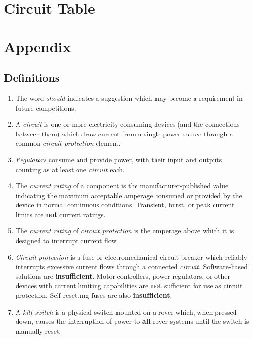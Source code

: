 \section{Circuit Table}

\section{Appendix}

    \subsection{Definitions}

    \begin{enumerate}
        \item The word \textit{should} indicates a suggestion which may become a requirement in future competitions.
        \item A \textit{circuit} is one or more electricity-consuming devices (and the connections between them) which draw current from a single power source through a common \textit{circuit protection} element.
        \item \textit{Regulators} consume and provide power, with their input and outputs counting as at least one \textit{circuit} each.
        \item The \textit{current rating} of a component is the manufacturer-published value indicating the maximum acceptable amperage consumed or provided by the device in normal continuous conditions. Transient, burst, or peak current limits are \textbf{not} current ratings.
        \item The \textit{current rating} of \textit{circuit protection} is the amperage above which it is designed to interrupt current flow.
        \item \textit{Circuit protection} is a fuse or electromechanical circuit-breaker which reliably interrupts excessive current flows through a connected \textit{circuit}. Software-based solutions are \textbf{insufficient}. Motor controllers, power regulators, or other devices with current limiting capabilities are \textbf{not} sufficient for use as circuit protection. Self-resetting fuses are also \textbf{insufficient}.
        \item A \textit{kill switch} is a physical switch mounted on a rover which, when pressed down, causes the interruption of power to \textbf{all} rover systems until the switch is manually reset.
    \end{enumerate}

